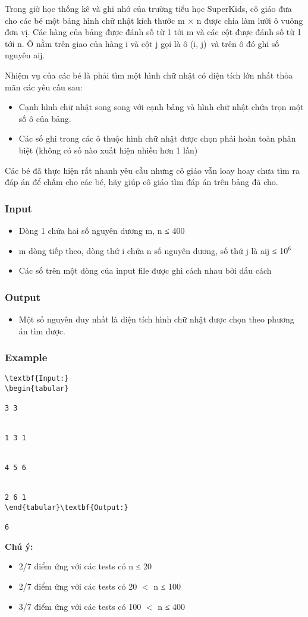 

Trong giờ học thống kê và ghi nhớ của trường tiểu học SuperKids, cô giáo đưa cho các bé một bảng hình chữ nhật kích thước m × n được chia làm lưới ô vuông đơn vị. Các hàng của bảng được đánh số từ 1 tới m và các cột được đánh số từ 1 tới n. Ô nằm trên giao của hàng i và cột j gọi là ô (i, j) và trên ô đó ghi số nguyên aij.

Nhiệm vụ của các bé là phải tìm một hình chữ nhật có diện tích lớn nhất thỏa mãn các yêu cầu sau:
\begin{itemize}
	\item Cạnh hình chữ nhật song song với cạnh bảng và hình chữ nhật chứa trọn một số ô của bảng.
	\item Các số ghi trong các ô thuộc hình chữ nhật được chọn phải hoàn toàn phân biệt (không có số nào xuất hiện nhiều hơn 1 lần)
\end{itemize}

Các bé đã thực hiện rất nhanh yêu cầu nhưng cô giáo vẫn loay hoay chưa tìm ra đáp án để chấm cho các bé, hãy giúp cô giáo tìm đáp án trên bảng đã cho.

\subsubsection{Input}
\begin{itemize}
	\item Dòng 1 chứa hai số nguyên dương m, n ≤ 400
	\item m dòng tiếp theo, dòng thứ i chứa n số nguyên dương, số thứ j là aij ≤ 10$^6$
	\item Các số trên một dòng của input file được ghi cách nhau bởi dấu cách
\end{itemize}

\subsubsection{Output}
\begin{itemize}
	\item Một số nguyên duy nhất là diện tích hình chữ nhật được chọn theo phương án tìm được.
\end{itemize}

\subsubsection{Example}
\begin{verbatim}
\textbf{Input:}
\begin{tabular}

3 3  


1 3 1  


4 5 6  


2 6 1
\end{tabular}\textbf{Output:}

6\end{verbatim}

\textbf{ Chú ý: }
\begin{itemize}
	\item 2/7 điểm ứng với các tests có n ≤ 20 
	\item 2/7 điểm ứng với các tests có 20 $<$ n ≤ 100
	\item 3/7 điểm ứng với các tests có 100 $<$ n ≤ 400
\end{itemize}
